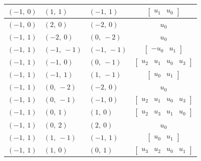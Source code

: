 \documentclass[11pt]{article}
\theoremstyle{definition}
\begin{document}
\begin{longtable}{|l|l|l|c|}
    \hline
    $\left( -1, \  0\right)$ & $\left( 1, \  1\right)$ & $\left( -1, \  1\right)$ & $\left[\begin{matrix}u_{1} & u_{0}\end{matrix}\right]$ \\
    \hline
    $\left( -1, \  0\right)$ & $\left( 2, \  0\right)$ & $\left( -2, \  0\right)$ & $u_{0}$ \\
    \hline
    $\left( -1, \  1\right)$ & $\left( -2, \  0\right)$ & $\left( 0, \  -2\right)$ & $u_{0}$ \\
    \hline
    $\left( -1, \  1\right)$ & $\left( -1, \  -1\right)$ & $\left( -1, \  -1\right)$ & $\left[\begin{matrix}- u_{0} & u_{1}\end{matrix}\right]$ \\
    \hline
    $\left( -1, \  1\right)$ & $\left( -1, \  0\right)$ & $\left( 0, \  -1\right)$ & $\left[\begin{matrix}u_{2} & u_{1} & u_{0} & u_{3}\end{matrix}\right]$ \\
    \hline
    $\left( -1, \  1\right)$ & $\left( -1, \  1\right)$ & $\left( 1, \  -1\right)$ & $\left[\begin{matrix}u_{0} & u_{1}\end{matrix}\right]$ \\
    \hline
    $\left( -1, \  1\right)$ & $\left( 0, \  -2\right)$ & $\left( -2, \  0\right)$ & $u_{0}$ \\
    \hline
    $\left( -1, \  1\right)$ & $\left( 0, \  -1\right)$ & $\left( -1, \  0\right)$ & $\left[\begin{matrix}u_{2} & u_{1} & u_{0} & u_{3}\end{matrix}\right]$ \\
    \hline
    $\left( -1, \  1\right)$ & $\left( 0, \  1\right)$ & $\left( 1, \  0\right)$ & $\left[\begin{matrix}u_{2} & u_{3} & u_{1} & u_{0}\end{matrix}\right]$ \\
    \hline
    $\left( -1, \  1\right)$ & $\left( 0, \  2\right)$ & $\left( 2, \  0\right)$ & $u_{0}$ \\
    \hline
    $\left( -1, \  1\right)$ & $\left( 1, \  -1\right)$ & $\left( -1, \  1\right)$ & $\left[\begin{matrix}u_{0} & u_{1}\end{matrix}\right]$ \\
    \hline
    $\left( -1, \  1\right)$ & $\left( 1, \  0\right)$ & $\left( 0, \  1\right)$ & $\left[\begin{matrix}u_{3} & u_{2} & u_{0} & u_{1}\end{matrix}\right]$ \\

\end{longtable}
\end{document}

